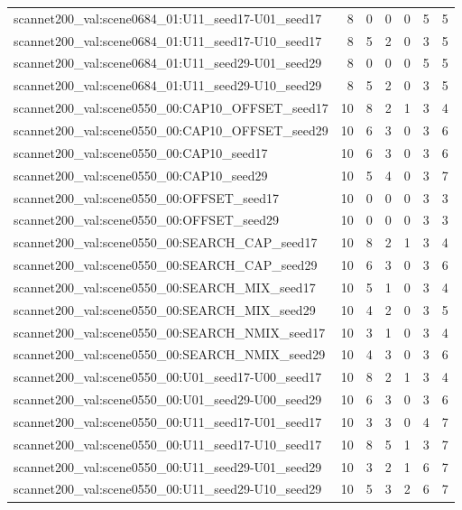 \begin{table}[t]
\begin{tabular}{lrrrrrr}
scannet200\_val:scene0684\_01:U11\_seed17-U01\_seed17 & 8 & 0 & 0 & 0 & 5 & 5 \\
scannet200\_val:scene0684\_01:U11\_seed17-U10\_seed17 & 8 & 5 & 2 & 0 & 3 & 5 \\
scannet200\_val:scene0684\_01:U11\_seed29-U01\_seed29 & 8 & 0 & 0 & 0 & 5 & 5 \\
scannet200\_val:scene0684\_01:U11\_seed29-U10\_seed29 & 8 & 5 & 2 & 0 & 3 & 5 \\
scannet200\_val:scene0550\_00:CAP10\_OFFSET\_seed17 & 10 & 8 & 2 & 1 & 3 & 4 \\
scannet200\_val:scene0550\_00:CAP10\_OFFSET\_seed29 & 10 & 6 & 3 & 0 & 3 & 6 \\
scannet200\_val:scene0550\_00:CAP10\_seed17 & 10 & 6 & 3 & 0 & 3 & 6 \\
scannet200\_val:scene0550\_00:CAP10\_seed29 & 10 & 5 & 4 & 0 & 3 & 7 \\
scannet200\_val:scene0550\_00:OFFSET\_seed17 & 10 & 0 & 0 & 0 & 3 & 3 \\
scannet200\_val:scene0550\_00:OFFSET\_seed29 & 10 & 0 & 0 & 0 & 3 & 3 \\
scannet200\_val:scene0550\_00:SEARCH\_CAP\_seed17 & 10 & 8 & 2 & 1 & 3 & 4 \\
scannet200\_val:scene0550\_00:SEARCH\_CAP\_seed29 & 10 & 6 & 3 & 0 & 3 & 6 \\
scannet200\_val:scene0550\_00:SEARCH\_MIX\_seed17 & 10 & 5 & 1 & 0 & 3 & 4 \\
scannet200\_val:scene0550\_00:SEARCH\_MIX\_seed29 & 10 & 4 & 2 & 0 & 3 & 5 \\
scannet200\_val:scene0550\_00:SEARCH\_NMIX\_seed17 & 10 & 3 & 1 & 0 & 3 & 4 \\
scannet200\_val:scene0550\_00:SEARCH\_NMIX\_seed29 & 10 & 4 & 3 & 0 & 3 & 6 \\
scannet200\_val:scene0550\_00:U01\_seed17-U00\_seed17 & 10 & 8 & 2 & 1 & 3 & 4 \\
scannet200\_val:scene0550\_00:U01\_seed29-U00\_seed29 & 10 & 6 & 3 & 0 & 3 & 6 \\
scannet200\_val:scene0550\_00:U11\_seed17-U01\_seed17 & 10 & 3 & 3 & 0 & 4 & 7 \\
scannet200\_val:scene0550\_00:U11\_seed17-U10\_seed17 & 10 & 8 & 5 & 1 & 3 & 7 \\
scannet200\_val:scene0550\_00:U11\_seed29-U01\_seed29 & 10 & 3 & 2 & 1 & 6 & 7 \\
scannet200\_val:scene0550\_00:U11\_seed29-U10\_seed29 & 10 & 5 & 3 & 2 & 6 & 7 \\

\end{tabular}
\end{table}
